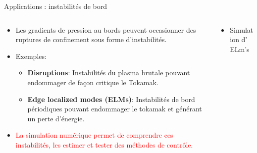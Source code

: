 \begin{frame}{Applications : instabilit\'es de bord}
\small
\begin{columns}
\begin{column}{6.5cm}
\begin{itemize}
\item Les gradients  de pression au bords peuvent occasionner des ruptures de confinement sous forme d'instabilit\'es.
\item Exemples: 
\begin{itemize}
\item \textbf{Disruptions}: Instabilit\'es du plasma brutale pouvant endommager de fa\c{c}on critique le Tokamak.
\item \textbf{Edge localized modes (ELMs)}: Instabilit\'es de bord p\'eriodiques  pouvant endommager le tokamak et g\'en\'erant un perte d'\'energie.
\end{itemize}
\vspace{1mm}
\item \textcolor{red}{La simulation num\'erique permet de comprendre ces instabilit\'es, les estimer et tester des m\'ethodes de contr\^{o}le}. 
\end{itemize}
\end{column}
\begin{column}{7.5cm}
\begin{itemize}
\item Simulation d' ELm's 
\end{itemize}
\end{column}
\end{columns}
\end{frame} 

